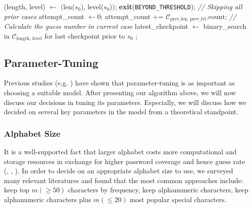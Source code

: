\documentclass{article} %
\newcommand\comment[1]{\textit{#1}}
\theoremstyle{definition}
\theoremstyle{theorem}
\theoremstyle{remark}
\theoremstyle{remark}
\begin{document}
\begin{algorithm}[!htbp]
\begin{algorithmic}
        \State
        \State (length, level) $\gets$ $($len($s_0$), level($s_0$)$)$;  
            \State\textbf{exit}(\texttt{BEYOND\_THRESHOLD});
        \EndIf
        \State\comment{// Skipping all prior cases}
        \State attempt\_count $\gets 0$;
            \State attempt\_count += $\mathcal{C}_{\text{prev\_len, prev\_lvl}}\text{.count}$;  
        \EndFor
        \State\comment{// Calculate the guess number in current case}
        \State latest\_checkpoint $\gets$ binary\_search in $\mathcal{C}_{\text{length, level}}$ for last checkpoint prior to $s_0$
        \State {}      
        \State{};
    \end{algorithmic}
\end{algorithm}

\subsection{Parameter-Tuning}
\par\quad Previous studies (e.g. \cite{guessability}) have shown that parameter-tuning is as important as choosing a suitable model. After presenting our algorithm above, we will now discuss our decisions in tuning its parameters. Especially, we will discuss how we decided on several key parameters in the model from a theoretical standpoint.

\subsubsection{Alphabet Size}
\par\quad It is a well-supported fact that larger alphabet costs more computational and storage resources in exchange for higher password coverage and hence guess rate (\cite{adaptive markov}, \cite{empirical}, \cite{omen}). In order to decide on an appropriate alphabet size to use, we surveyed many relevant literatures and found that the most common approaches include: keep top $m (\geq 50)$ characters by frequency, keep alphanumeric characters, keep alphanumeric characters plus $m (\leq 20)$ most popular special characters.
\end{document}
